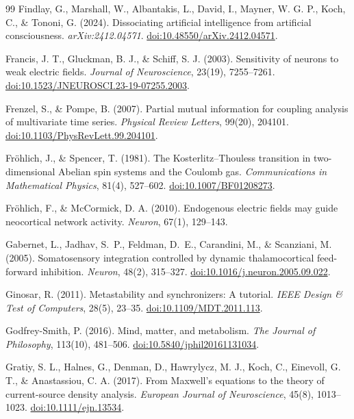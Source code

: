 \begin{thebibliography}{99}
 Findlay, G., Marshall, W., Albantakis, L., David, I., Mayner, W. G. P., Koch, C., \& Tononi, G. (2024). Dissociating artificial intelligence from artificial consciousness. \textit{arXiv:2412.04571}. \href{https://doi.org/10.48550/arXiv.2412.04571}{doi:10.48550/arXiv.2412.04571}.

 Francis, J. T., Gluckman, B. J., \& Schiff, S. J. (2003). Sensitivity of neurons to weak electric fields. \textit{Journal of Neuroscience}, 23(19), 7255--7261. \href{https://doi.org/10.1523/JNEUROSCI.23-19-07255.2003}{doi:10.1523/JNEUROSCI.23-19-07255.2003}.

 Frenzel, S., \& Pompe, B. (2007). Partial mutual information for coupling analysis of multivariate time series. \textit{Physical Review Letters}, 99(20), 204101. \href{https://doi.org/10.1103/PhysRevLett.99.204101}{doi:10.1103/PhysRevLett.99.204101}.

 Fr\"{o}hlich, J., \& Spencer, T. (1981). The Kosterlitz--Thouless transition in two-dimensional Abelian spin systems and the Coulomb gas. \textit{Communications in Mathematical Physics}, 81(4), 527--602. \href{https://doi.org/10.1007/BF01208273}{doi:10.1007/BF01208273}.

 Fr\"{o}hlich, F., \& McCormick, D. A. (2010). Endogenous electric fields may guide neocortical network activity. \textit{Neuron}, 67(1), 129--143.

 Gabernet, L., Jadhav, S.~P., Feldman, D.~E., Carandini, M., \& Scanziani, M. (2005). Somatosensory integration controlled by dynamic thalamocortical feed-forward inhibition. \textit{Neuron}, 48(2), 315--327. \href{https://doi.org/10.1016/j.neuron.2005.09.022}{doi:10.1016/j.neuron.2005.09.022}.

 Ginosar, R. (2011). Metastability and synchronizers: A tutorial. \textit{IEEE Design \& Test of Computers}, 28(5), 23--35. \href{https://doi.org/10.1109/MDT.2011.113}{doi:10.1109/MDT.2011.113}.

 Godfrey-Smith, P. (2016). Mind, matter, and metabolism. \textit{The Journal of Philosophy}, 113(10), 481--506. \href{https://doi.org/10.5840/jphil20161131034}{doi:10.5840/jphil20161131034}.

 Gratiy, S. L., Halnes, G., Denman, D., Hawrylycz, M. J., Koch, C., Einevoll, G. T., \& Anastassiou, C. A. (2017). From Maxwell's equations to the theory of current-source density analysis. \textit{European Journal of Neuroscience}, 45(8), 1013--1023. \href{https://doi.org/10.1111/ejn.13534}{doi:10.1111/ejn.13534}.


\end{thebibliography}
